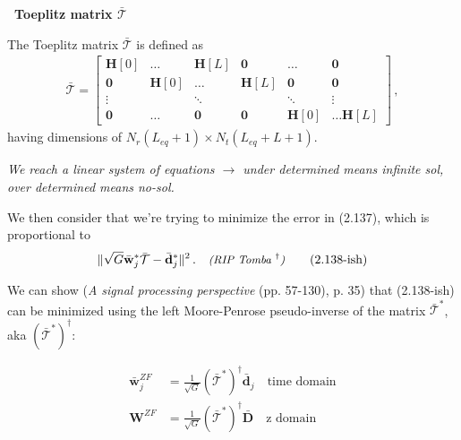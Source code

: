 \documentclass[a4paper, 12pt]{book}
\begin{document}



\noindent
\colorbox{obsidianBlue}{%
    \begin{minipage}{\dimexpr\linewidth-2\fboxsep}
    \textcolor{obsidianTextBlue}{\textbf{\faPen\ Toeplitz matrix $\bar{\mathcal{T}}$}}
    
    The Toeplitz matrix $\bar{\mathcal{T}}$ is defined as
    \begin{align}
        \bar{\mathcal{T}} = \begin{bmatrix}
        \mathbf{H}[0] & \dots & \mathbf{H}[L] & \mathbf{0} & \dots & \mathbf{0} \\
        \mathbf{0} & \mathbf{H}[0] & \dots & \mathbf{H}[L] & \mathbf{0} & \mathbf{0} \\
        \vdots & & \ddots & & \ddots & \vdots \\
        \mathbf{0} & \dots & \mathbf{0} & \mathbf{0} & \mathbf{H}[0] & \dots \mathbf{H}[L]
        \end{bmatrix} \,, \tag{2.136}
    \end{align}
    having dimensions of $N_r(L_{eq} + 1) \times N_t(L_{eq} + L + 1)$.
    \end{minipage}%
}

\vspace{0.5em}
\noindent
\textit{We reach a linear system of equations $\rightarrow$ under determined means infinite sol, over determined means no-sol.}

We then consider that we're trying to minimize the error in (2.137), which is proportional to
\begin{align}
    \lVert \sqrt{G}\bar{\mathbf{w}}_j^* \bar{\mathcal{T}} - \bar{\mathbf{d}}_j^* \rVert^2 \,. \quad \text{\small\textit{(RIP Tomba $^\dagger$)}} \tag{2.138-ish}
\end{align}

We can show (\textit{A signal processing perspective} (pp. 57-130), p. 35) that (2.138-ish) can be minimized using the left Moore-Penrose pseudo-inverse of the matrix $\bar{\mathcal{T}}^*$, aka $(\bar{\mathcal{T}}^*)^{\dagger}$:

\begin{align}
    \bar{\mathbf{w}}_j^{ZF} &= \frac{1}{\sqrt{G}} (\bar{\mathcal{T}}^*)^{\dagger} \bar{\mathbf{d}}_j \quad \text{time domain} \tag{2.145} \\
    \mathbf{W}^{ZF} &= \frac{1}{\sqrt{G}} (\bar{\mathcal{T}}^*)^{\dagger} \bar{\mathbf{D}} \quad \text{z domain} \tag{2.146}
\end{align}
\end{document}
